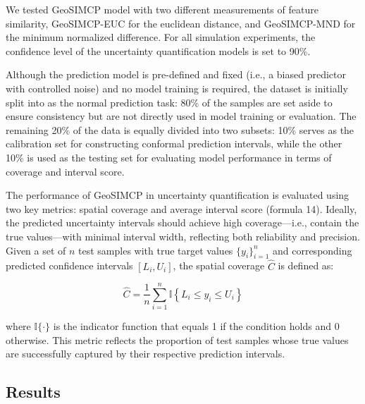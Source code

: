 \documentclass[authoryear,preprint,review,12pt]{elsarticle}
\begin{document}
We tested GeoSIMCP model with two different measurements of feature similarity, GeoSIMCP-EUC for the euclidean distance, and GeoSIMCP-MND for the minimum normalized difference. For all simulation experiments, the confidence level of the uncertainty quantification models is set to 90\%.



Although the prediction model is pre-defined and fixed (i.e., a biased predictor with controlled noise) and no model training is required,  
the dataset is initially split into as the normal prediction task: 80\% of the samples are set aside to ensure consistency but are not directly used in model training or evaluation. The remaining 20\% of the data is equally divided into two subsets: 10\% serves as the calibration set for constructing conformal prediction intervals, while the other 10\% is used as the testing set for evaluating model performance in terms of coverage and interval score.

The performance of GeoSIMCP in uncertainty quantification is evaluated using two key metrics: spatial coverage and average interval score (formula 14). Ideally, the predicted uncertainty intervals should achieve high coverage—i.e., contain the true values—with minimal interval width, reflecting both reliability and precision. Given a set of $n$ test samples with true target values $\{y_i\}_{i=1}^n$ and corresponding predicted confidence intervals $[L_i, U_i]$, the spatial coverage $\hat{C}$ is defined as:

\begin{equation}
\hat{C} = \frac{1}{n} \sum_{i=1}^n \mathbb{I}\left\{ L_i \leq y_i \leq U_i \right\}
\end{equation}

where $\mathbb{I}\{\cdot\}$ is the indicator function that equals 1 if the condition holds and 0 otherwise. This metric reflects the proportion of test samples whose true values are successfully captured by their respective prediction intervals.







\subsection{Results}
\end{document}
